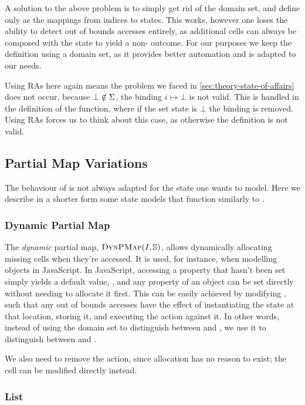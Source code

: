 A solution to the above problem is to simply get rid of the domain set, and define \PMap{} only as the mappings from indices to states. This works, however one loses the ability to detect out of bounds accesses entirely, as additional cells can always be composed with the state to yield a non-\Miss{} outcome. For our purposes we keep the definition using a domain set, as it provides better automation and is adapted to our needs.

Using RAs here again means the problem we faced in \cref{sec:theory-state-of-affairs} does not occur, because $\bot\notin\Sigma$, the binding $i\mapsto\bot$ is not valid. This is handled in the definition of the  function, where if the set state is $\bot$ the binding is removed. Using RAs forces us to think about this case, as otherwise the definition is not valid.

\subsection{Partial Map Variations}

The behaviour of \PMap{} is not always adapted for the state one wants to model. Here we describe in a shorter form some state models that function similarly to \PMap.

\subsubsection{Dynamic Partial Map}

The \emph{dynamic} partial map, $\textsc{DynPMap}(I,\mathbb S)$, allows dynamically allocating missing cells when they're accessed. It is used, for instance, when modelling objects in JavaScript. In JavaScript, accessing a property that hasn't been set simply yields a default value, , and any property of an object can be set directly without needing to allocate it first. This can be easily achieved by modifying \PMap, such that any out of bounds accesses have the effect of instantiating the state at that location, storing it, and executing the action against it. In other words, instead of using the domain set to distinguish between \Err{} and \Miss, we use it to distinguish between \Ok{} and \Miss{} \cite{sacha-phd}.

We also need to remove the \alloc{} action, since allocation has no reason to exist; the cell can be modified directly instead.

\subsubsection{List}

